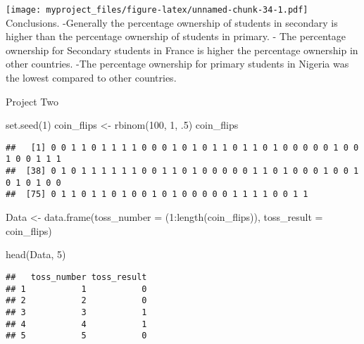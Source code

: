 \documentclass[
]{article}
\newenvironment{Shaded}{\begin{snugshade}}{\end{snugshade}}
\newcommand{\AttributeTok}[1]{\textcolor[rgb]{0.77,0.63,0.00}{#1}}
\newcommand{\DecValTok}[1]{\textcolor[rgb]{0.00,0.00,0.81}{#1}}
\newcommand{\FunctionTok}[1]{\textcolor[rgb]{0.00,0.00,0.00}{#1}}
\newcommand{\NormalTok}[1]{#1}
\newcommand{\OtherTok}[1]{\textcolor[rgb]{0.56,0.35,0.01}{#1}}
\newcommand{\SpecialCharTok}[1]{\textcolor[rgb]{0.00,0.00,0.00}{#1}}
\begin{document}
\texttt{[image: myproject\_files/figure-latex/unnamed-chunk-34-1.pdf]}
Conclusions. -Generally the percentage ownership of students in
secondary is higher than the percentage ownership of students in
primary. - The percentage ownership for Secondary students in France is
higher the percentage ownership in other countries. -The percentage
ownership for primary students in Nigeria was the lowest compared to
other countries.

Project Two

\begin{Shaded}
\begin{Highlighting}[]
\FunctionTok{set.seed}\NormalTok{(}\DecValTok{1}\NormalTok{)}
\NormalTok{coin\_flips }\OtherTok{\textless{}{-}} \FunctionTok{rbinom}\NormalTok{(}\DecValTok{100}\NormalTok{, }\DecValTok{1}\NormalTok{, .}\DecValTok{5}\NormalTok{)}
\NormalTok{coin\_flips}
\end{Highlighting}
\end{Shaded}

\begin{verbatim}
##   [1] 0 0 1 1 0 1 1 1 1 0 0 0 1 0 1 0 1 1 0 1 1 0 1 0 0 0 0 0 1 0 0 1 0 0 1 1 1
##  [38] 0 1 0 1 1 1 1 1 1 0 0 1 1 0 1 0 0 0 0 0 1 1 0 1 0 0 0 1 0 0 1 0 1 0 1 0 0
##  [75] 0 1 1 0 1 1 0 1 0 0 1 0 1 0 0 0 0 0 1 1 1 1 0 0 1 1
\end{verbatim}

\begin{Shaded}
\begin{Highlighting}[]
\NormalTok{Data }\OtherTok{\textless{}{-}} \FunctionTok{data.frame}\NormalTok{(}\AttributeTok{toss\_number =}\NormalTok{ (}\DecValTok{1}\SpecialCharTok{:}\FunctionTok{length}\NormalTok{(coin\_flips)), }\AttributeTok{toss\_result =}\NormalTok{ coin\_flips)}

\FunctionTok{head}\NormalTok{(Data, }\DecValTok{5}\NormalTok{)}
\end{Highlighting}
\end{Shaded}

\begin{verbatim}
##   toss_number toss_result
## 1           1           0
## 2           2           0
## 3           3           1
## 4           4           1
## 5           5           0
\end{verbatim}
\end{document}
